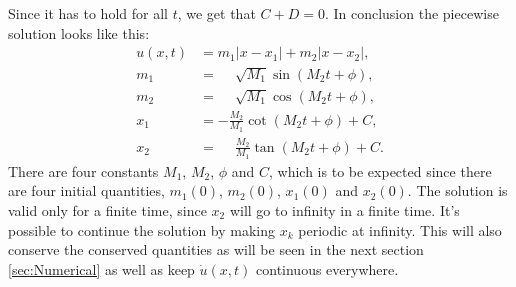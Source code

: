 \documentclass[english,master]{liumaiex}
\theoremstyle{plain}
\theoremstyle{definition}
\begin{document}
%
Since it has to hold for all $t$, we get that $C + D = 0$.
In conclusion the piecewise solution looks like this:
\begin{align}
	u(x, t) &= m_1|x - x_1| + m_2|x - x_2|, \\
	m_1 &= \phantom{-}\sqrt{M_1} \sin(M_2t + \phi), \\
	m_2 &= \phantom{-}\sqrt{M_1} \cos(M_2t + \phi), \\
	x_1 &= -\frac{M_2}{M_1}\cot(M_2t + \phi) + C, \\
	x_2 &= \phantom{-}\frac{M_2}{M_1}\tan(M_2t + \phi) + C.
\end{align}
%
There are four constants $M_1$, $M_2$, $\phi$ and $C$, which is to be expected since there are four initial quantities, $m_1(0)$, $m_2(0)$, $x_1(0)$ and $x_2(0)$. The solution is valid only for a finite time, since $x_2$ will go to infinity in a finite time. It's possible to continue the solution by making $x_k$ periodic at infinity. This will also conserve the conserved quantities as will be seen in the next section \ref{sec:Numerical} as well as keep $\dot{u}(x, t)$ continuous everywhere.

\begin{center}
\end{center}


\end{document}
